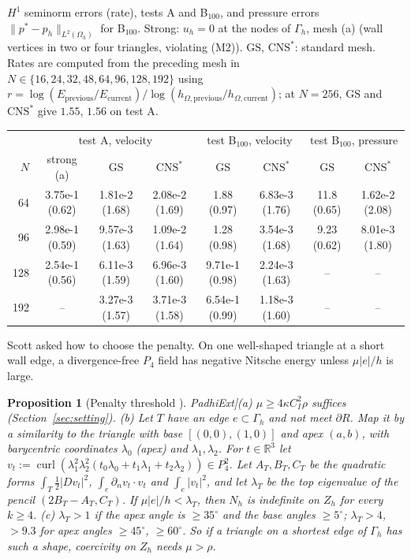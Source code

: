 \documentclass[5p,times]{elsarticle}
\newtheorem{proposition}[theorem]{Proposition}
\theoremstyle{definition}
\newcommand{\R}{\mathbb R}
\newcommand{\Gh}{\Gamma_h}
\newcommand{\Oh}{\Omega_h}
\newcommand{\Zh}{Z_h}
\newcommand{\dn}{\partial_n}
\newcommand{\norm}[1]{\lVert #1\rVert}
\newcommand{\GS}{\mathrm{GS}}
\newcommand{\CNS}{\mathrm{CNS}^\ast}
\newcommand{\curl}{\operatorname{curl}}
\newcommand{\ext}[1]{\cite[#1]{PadhiExt}}
\begin{document}
\begin{\tabenv}[!tb]
\centering\footnotesize\setlength{\tabcolsep}{3pt}
\caption{$H^1$ seminorm errors (rate), tests A and B$_{100}$, and pressure errors $\norm{p^\ast-p_h}_{L^2(\Oh)}$ for B$_{100}$. Strong: $u_h=0$ at the nodes of $\Gh$, mesh (a) (wall vertices in two or four triangles, violating (M2)). $\GS$, $\CNS$: standard mesh. Rates are computed from the preceding mesh in $N\in\{16,24,32,48,64,96,128,192\}$ using $r=\log(E_{\mathrm{previous}}/E_{\mathrm{current}})/\log(h_{\Omega,\mathrm{previous}}/h_{\Omega,\mathrm{current}})$; at $N=256$, $\GS$ and $\CNS$ give $1.55$, $1.56$ on test A.}\label{tab:rates}
\begin{tabular}{rccccccc}
\toprule
 & \multicolumn{3}{c}{test A, velocity} & \multicolumn{2}{c}{test B$_{100}$, velocity} & \multicolumn{2}{c}{test B$_{100}$, pressure}\\
\cmidrule(lr){2-4}\cmidrule(lr){5-6}\cmidrule(lr){7-8}
$N$ & strong (a) & $\GS$ & $\CNS$ & $\GS$ & $\CNS$ & $\GS$ & $\CNS$\\
\midrule
64 & 3.75e-1 (0.62) & 1.81e-2 (1.68) & 2.08e-2 (1.69) & 1.88 (0.97) & 6.83e-3 (1.76) & 11.8 (0.65) & 1.62e-2 (2.08)\\
96 & 2.98e-1 (0.59) & 9.57e-3 (1.63) & 1.09e-2 (1.64) & 1.28 (0.98) & 3.54e-3 (1.68) & 9.23 (0.62) & 8.01e-3 (1.80)\\
128 & 2.54e-1 (0.56) & 6.11e-3 (1.59) & 6.96e-3 (1.60) & 9.71e-1 (0.98) & 2.24e-3 (1.63) & -- & --\\
192 & -- & 3.27e-3 (1.57) & 3.71e-3 (1.58) & 6.54e-1 (0.99) & 1.18e-3 (1.60) & -- & --\\
\bottomrule
\end{tabular}
\end{\tabenv}

Scott asked how to choose the penalty. On one well-shaped triangle at a short wall edge, a divergence-free $P_4$ field has negative Nitsche energy unless $\mu|e|/h$ is large.

\begin{proposition}[Penalty threshold \ext{\S10}]\label{prop:penalty}
(a) $\mu\ge4\kappa C_I^2\rho$ suffices (Section~\ref{sec:setting}). (b) Let $T$ have an edge $e\subset\Gh$ and not meet $\partial R$. Map it by a similarity to the triangle with base $[(0,0),(1,0)]$ and apex $(a,b)$, with barycentric coordinates $\lambda_0$ (apex) and $\lambda_1,\lambda_2$. For $t\in\R^3$ let $v_t:=\curl(\lambda_1^2\lambda_2^2(t_0\lambda_0+t_1\lambda_1+t_2\lambda_2))\in P_4^2$. Let $A_T,B_T,C_T$ be the quadratic forms $\int_T\frac12|Dv_t|^2$, $\int_e\dn v_t\cdot v_t$ and $\int_e|v_t|^2$, and let $\lambda_T$ be the top eigenvalue of the pencil $(2B_T-A_T,C_T)$. If $\mu|e|/h<\lambda_T$, then $N_h$ is indefinite on $\Zh$ for every $k\ge4$. (c) $\lambda_T>1$ if the apex angle is $\ge35^\circ$ and the base angles $\ge5^\circ$; $\lambda_T>4$, $>9.3$ for apex angles $\ge45^\circ$, $\ge60^\circ$. So if a triangle on a shortest edge of $\Gh$ has such a shape, coercivity on $\Zh$ needs $\mu>\rho$.
\end{proposition}
\end{document}
